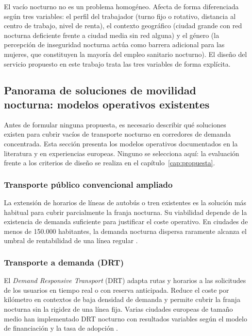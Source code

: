 El vacío nocturno no es un problema homogéneo. Afecta de forma diferenciada
según tres variables: el perfil del trabajador (turno fijo o rotativo,
distancia al centro de trabajo, nivel de renta), el contexto geográfico
(ciudad grande con red nocturna deficiente frente a ciudad media sin red
alguna) y el género (la percepción de inseguridad nocturna actúa como
barrera adicional para las mujeres, que constituyen la mayoría del empleo
sanitario nocturno). El diseño del servicio propuesto en este trabajo trata
las tres variables de forma explícita.



\subsection{Panorama de soluciones de movilidad nocturna: modelos operativos existentes}
\label{sec:panorama-soluciones}

Antes de formular ninguna propuesta, es necesario describir
qué soluciones existen para cubrir vacíos de transporte
nocturno en corredores de demanda concentrada. Esta sección
presenta los modelos operativos documentados en la
literatura y en experiencias europeas. Ninguno se selecciona
aquí: la evaluación frente a los criterios de diseño
se realiza en el capítulo~\ref{cap:propuesta}.

\subsubsection{Transporte público convencional ampliado}
\label{sec:sol-tp-convencional}

La extensión de horarios de líneas de autobús o tren
existentes es la solución más habitual para cubrir
parcialmente la franja nocturna. Su viabilidad depende
de la existencia de demanda suficiente para justificar
el coste operativo. En ciudades de menos de 150.000
habitantes, la demanda nocturna dispersa raramente
alcanza el umbral de rentabilidad de una línea regular
\parencite{Estrada2021}.

\subsubsection{Transporte a demanda (DRT)}
\label{sec:sol-drt}

El \emph{Demand Responsive Transport} (DRT) adapta rutas
y horarios a las solicitudes de los usuarios en tiempo
real o con reserva anticipada. Reduce el coste por
kilómetro en contextos de baja densidad de demanda y
permite cubrir la franja nocturna sin la rigidez de
una línea fija. Varias ciudades europeas de tamaño medio
han implementado DRT nocturno con resultados variables
según el modelo de financiación y la tasa de adopción
\parencite{Busitalia2019QuiBus, K2Centrum2025DRT}.

